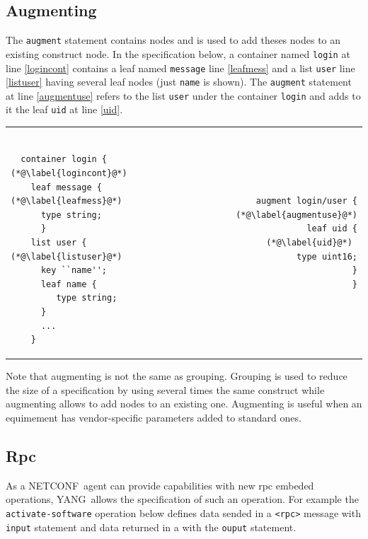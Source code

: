 \documentclass[a4paper]{article}
\newcommand{\nc}{NETCONF}
\newcommand{\y}{YANG}
\begin{document}
\subsection{Augmenting}

The {\tt augment}  statement contains nodes and is  used to add theses
nodes to  an existing  construct node. In  the specification  below, a
container named  {\tt login} at  line \ref{logincont} contains  a leaf
named {\tt  message} line  \ref{leafmess} and a  list {\tt  user} line
\ref{listuser} having  several leaf nodes (just {\tt  name} is shown).
The  {\tt augment} statement  at line  \ref{augmentuse} refers  to the
list {\tt  user} under the  container {\tt login}  and adds to  it the
leaf {\tt uid} at line \ref{uid}.

\noindent
\begin{tabular}{lr}
\begin{minipage}{.5\textwidth}
\begin{lstlisting}[name=augment]

  container login { (*@\label{logincont}@*)
    leaf message {  (*@\label{leafmess}@*)
      type string;
      }
    list user {      (*@\label{listuser}@*)
      key ``name'';
      leaf name { 
         type string;
      }
      ...
    }
\end{lstlisting}
\end{minipage}
&
\begin{minipage}{.5\textwidth}
\begin{lstlisting}[name=augment]
augment login/user {  (*@\label{augmentuse}@*)
  leaf uid {           (*@\label{uid}@*) 
    type uint16;
  }
}
\end{lstlisting}
\end{minipage}
\end{tabular}

Note that augmenting is not the  same as grouping. Grouping is used to
reduce the  size of  a specification by  using several times  the same
construct  while  augmenting  allows  to  add  nodes  to  an  existing
one.  Augmenting  is useful  when  an  equimement has  vendor-specific
parameters added to standard ones.

\subsection{Rpc}

As  a  \nc\  agent  can  provide capabilities  with  new  rpc  embeded
operations,  \y\ allows the  specification of  such an  operation. For
example  the  {\tt  activate-software}  operation below  defines  data
sended in  a {\tt <rpc>} message  with {\tt input}  statement and data
returned in a {\tt <rpc-reply>} with the {\tt ouput} statement.
\end{document}
